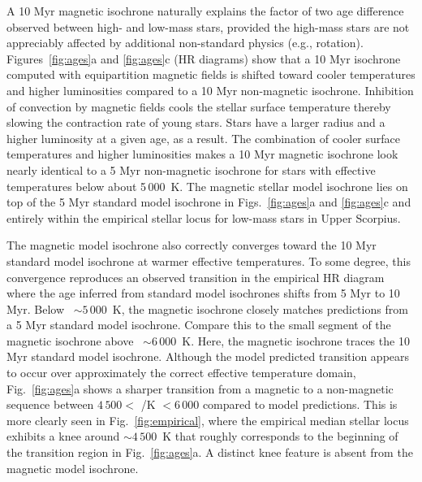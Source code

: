 \documentclass{aa}
\begin{document}
A 10 Myr magnetic isochrone naturally explains the factor of two age difference observed between high- and low-mass stars, provided the high-mass stars are not appreciably affected by additional non-standard physics (e.g., rotation). 
Figures~\ref{fig:ages}a and \ref{fig:ages}c (HR diagrams) show that a 10 Myr isochrone computed with equipartition magnetic fields is shifted toward cooler temperatures and higher luminosities compared to a 10 Myr non-magnetic isochrone. Inhibition of convection by magnetic fields cools the stellar surface temperature thereby slowing the contraction rate of young stars. Stars have a larger radius and a higher luminosity at a given age, as a result. The combination of cooler surface temperatures and higher luminosities makes a 10 Myr magnetic isochrone look nearly identical to a 5 Myr non-magnetic isochrone for stars with effective temperatures below about 5\,000~K. The magnetic stellar model isochrone lies on top of the 5 Myr standard model isochrone in Figs.~\ref{fig:ages}a and \ref{fig:ages}c and entirely within the empirical stellar locus for low-mass stars in Upper Scorpius. 

The magnetic model isochrone also correctly converges toward the 10 Myr standard model isochrone at warmer effective temperatures. To some degree, this  convergence reproduces an observed transition in the empirical HR diagram where the age inferred from standard model isochrones shifts from 5 Myr to 10 Myr. Below \teff~$\sim 5\,000$~K, the magnetic isochrone closely matches predictions from a 5 Myr standard model isochrone. Compare this to the small segment of the magnetic isochrone above \teff\ $\sim 6\,000$~K. Here, the magnetic isochrone traces the 10 Myr standard model isochrone. Although the model predicted transition appears to occur over approximately the correct effective temperature domain, Fig.~\ref{fig:ages}a shows a sharper transition from a magnetic to a non-magnetic sequence between $4\,500 <$ \teff/K $< 6\,000$ compared to model predictions. This is more clearly seen in Fig.~\ref{fig:empirical}, where the empirical median stellar locus exhibits a knee around \teff $\sim 4\,500$~K that roughly corresponds to the beginning of the transition region in Fig.~\ref{fig:ages}a. A distinct knee feature is absent from the magnetic model isochrone.
\end{document}
